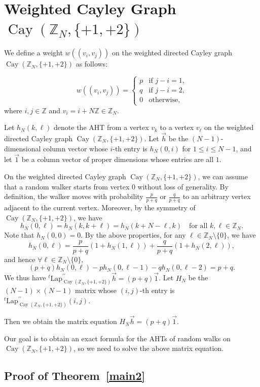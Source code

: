 \documentclass[12pt, leqno]{amsart}
\numberwithin{equation}{section}
\theoremstyle{plain}
\theoremstyle{definition}
\newcommand{\ZZ}{\mathbb{Z}}
\newcommand{\Lap}{\mathrm{Lap}}
\newcommand{\0}{\mathbf{0}}
\DeclareMathOperator{\Cay}{Cay}
\begin{document}
\section{Weighted Cayley Graph $\Cay(\ZZ_N,\{+1,+2\})$}

We define a weight $w((v_i,v_j))$ on the weighted directed Cayley graph $\Cay(\ZZ_N,\{+1,+2\})$ as follows: 

\[
w((v_i,v_j))=
\begin{cases}
p &\text{if $j-i=1$,}\\
q &\text{if $j-i=2$,}\\
0 &\text{otherwise,}
\end{cases}
\]
where $i,j\in\ZZ$ and $v_i=i+N\ZZ\in\ZZ_N$.

Let $h_N(k,\ell)$ denote the AHT from a vertex $v_k$ to a vertex $v_\ell$ on the weighted directed Cayley graph $\Cay(\ZZ_N,\{+1,+2\})$.
Let $\vec{h}$ be the $(N-1)$-dimensional column vector whose $i$-th entry is $h_N(0,i)$ for $1 \leq i \leq N-1$, and let $\vec{1}$ be a column vector of proper dimensions whose entries are all $1$.

On the weighted directed Cayley graph $\Cay(\ZZ_N,\{+1,+2\})$, we can assume that a random walker starts from vertex $0$ without loss of generality.
By definition, the walker moves with probability $\frac{p}{p+q}$ or $\frac{q}{p+q}$ to an arbitrary vertex adjacent to the current vertex.
Moreover, by the symmetry of $\Cay(\ZZ_N,\{+1,+2\})$, we have
\[
h_N(0,\ell)=h_N(k,k+\ell)=h_N(k+N-\ell,k) \quad \text{for all $k,\ell \in \mathbb{Z}_{N}$.}
\]
Note that $h_N(0,0)=0$.
By the above properties, for any $\ell \in\mathbb{Z}_N\setminus\{0\}$, we have
\[
h_N(0,\ell)=\frac{p}{p+q}(1+h_N(1,\ell))+\frac{q}{p+q}(1+h_N(2,\ell)),
\]
and hence $\forall \ell \in\mathbb{Z}_N\setminus\{0\}$,
\[
(p+q)h_N(0,\ell)-ph_N(0,\ell-1)-qh_N(0,\ell-2)=p+q.
\] 
We thus have ${}^t\Lap_{\Cay(\ZZ_N,\{+1,+2\})}^{\prime\prime} \vec{h}=(p+q)\vec{1}$.
Let $H_N$ be the $(N-1)\times(N-1)$ matrix whose $(i,j)$-th entry is ${}^t\Lap_{\Cay(\ZZ_N,\{+1,+2\})}^{\prime\prime}(i,j)$.

Then we obtain the matrix equation $H_N\vec{h}=(p+q)\vec{1}$.

Our goal is to obtain an exact formula for the AHTs of random walks on $\Cay(\ZZ_N,\{+1,+2\})$, so we need to solve the above matrix equation.

\subsection{Proof of Theorem~\ref{main2}}
\end{document}
